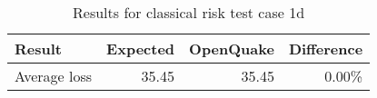 \begin{table}[htbp]

\centering
\begin{tabular}{ l r r r }

\hline
\rowcolor{anti-flashwhite}
\bf{Result} & \bf{Expected} & \bf{OpenQuake} & \bf{Difference}\\
\hline
Average loss & 35.45 & 35.45 & 0.00\% \\
\hline
\end{tabular}

\caption{Results for classical risk test case 1d}
\label{tab:result-cr-1d}
\end{table}